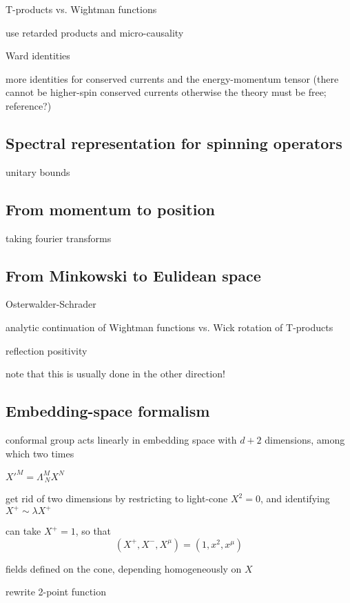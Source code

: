 \documentclass[a4paper,12pt]{article}
\numberwithin{equation}{section}
\begin{document}


T-products vs. Wightman functions

use retarded products and micro-causality


Ward identities

more identities for conserved currents and the energy-momentum tensor
(there cannot be higher-spin conserved currents otherwise the theory must be free; reference?)


\subsection{Spectral representation for spinning operators}

unitary bounds

\subsection{From momentum to position}

taking fourier transforms

\subsection{From Minkowski to Eulidean space}

Osterwalder-Schrader

analytic continuation of Wightman functions vs. Wick rotation of T-products

reflection positivity

note that this is usually done in the other direction!

\subsection{Embedding-space formalism}

conformal group acts linearly in embedding space with $d+2$ dimensions, among which two times

$X'^M = \Lambda^M_{~N} X^N$

get rid of two dimensions by restricting to light-cone $X^2 = 0$, and identifying $X^+ \sim \lambda X^+$


can take $X^+ = 1$, so that
\begin{equation}
	(X^+, X^-, X^\mu) = (1, x^2, x^\mu)
\end{equation}


fields defined on the cone, depending homogeneously on $X$

rewrite 2-point function
\end{document}
